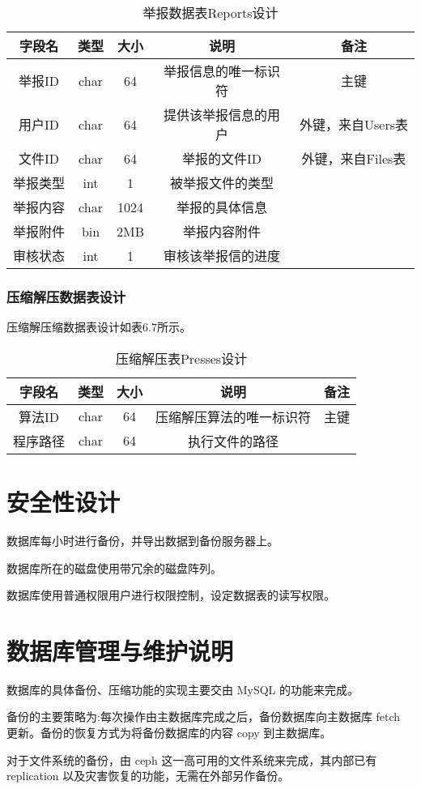 \begin{table}[htbp]
\centering
\caption{举报数据表Reports设计} \label{tab:reports-database}
\begin{tabular}{|c|c|c|c|c|}
    \hline
    字段名 & 类型 & 大小 & 说明 & 备注 \\
    \hline
    举报ID & char & 64 & 举报信息的唯一标识符 & 主键\\
    \hline
    用户ID & char & 64 & 提供该举报信息的用户 & 外键，来自Users表\\
    \hline
    文件ID & char & 64 & 举报的文件ID & 外键，来自Files表\\
    \hline
    举报类型 & int & 1 & 被举报文件的类型 & \\
    \hline
    举报内容 & char & 1024 & 举报的具体信息 & \\
    \hline
    举报附件 & bin & 2MB & 举报内容附件 & \\
    \hline
    审核状态 & int & 1 & 审核该举报信的进度 & \\
    \hline
\end{tabular}
\end{table}

\subsubsection{压缩解压数据表设计}
压缩解压缩数据表设计如表6.7所示。
\begin{table}[htbp]
\centering
\caption{压缩解压表Presses设计} \label{tab:presses-database}
\begin{tabular}{|c|c|c|c|c|}
    \hline
    字段名 & 类型 & 大小 & 说明 & 备注 \\
    \hline
    算法ID & char & 64 & 压缩解压算法的唯一标识符 & 主键\\
    \hline
    程序路径 & char & 64 & 执行文件的路径 & \\
    \hline
\end{tabular}
\end{table}

\section{安全性设计}
数据库每小时进行备份，并导出数据到备份服务器上。

数据库所在的磁盘使用带冗余的磁盘阵列。

数据库使用普通权限用户进行权限控制，设定数据表的读写权限。

\section{数据库管理与维护说明}
数据库的具体备份、压缩功能的实现主要交由 MySQL 的功能来完成。

备份的主要策略为:每次操作由主数据库完成之后，备份数据库向主数据库 fetch 更新。备份的恢复方式为将备份数据库的内容 copy 到主数据库。

对于文件系统的备份，由 ceph 这一高可用的文件系统来完成，其内部已有 replication 以及灾害恢复的功能，无需在外部另作备份。